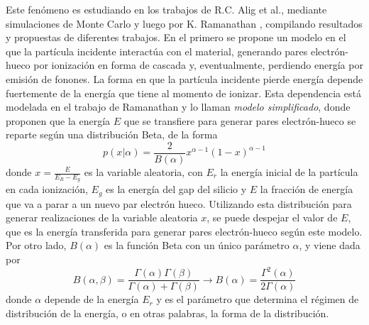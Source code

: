 Este fenómeno es estudiando en los trabajos de R.C. Alig et al.\cite{Alig}, mediante simulaciones de Monte Carlo y luego por K. Ramanathan \cite{Ramanathan}, compilando resultados y propuestas de diferentes trabajos. En el primero se propone un modelo en el que la partícula incidente interactúa con el material, generando pares electrón-hueco por ionización en forma de cascada y, eventualmente, perdiendo energía por emisión de fonones. La forma en que la partícula incidente pierde energía depende fuertemente de la energía que tiene al momento de ionizar. Esta dependencia está modelada en el trabajo de Ramanathan\cite{Ramanathan} y lo llaman \textit{modelo simplificado}, donde proponen que la energía $E$ que se transfiere para generar pares electrón-hueco se reparte según una distribución Beta, de la forma
\begin{equation*}
    p(x|\alpha) = \frac{2}{B(\alpha)} x^{\alpha - 1}(1-x)^{\alpha - 1}
\end{equation*}
donde $x = \frac{E}{E_{R} - E_{g}}$ es la variable aleatoria, con $E_{r}$ la energía inicial de la partícula en cada ionización, $E_{g}$ es la energía del gap del silicio y $E$ la fracción de energía que va a parar a un nuevo par electrón hueco. Utilizando esta distribución para generar realizaciones de la variable aleatoria $x$, se puede despejar el valor de $E$, que es la energía transferida para generar pares electrón-hueco según este modelo. Por otro lado, $B(\alpha)$ es la función Beta con un único parámetro $\alpha$, y viene dada por
\begin{equation*}
    B(\alpha, \beta) 
    = \frac{\Gamma(\alpha)\Gamma(\beta)}{\Gamma(\alpha) + \Gamma(\beta)}
    \longrightarrow
    B(\alpha)
    = \frac{\Gamma^{2}(\alpha)}{2\Gamma(\alpha)}
\end{equation*}
donde $\alpha$ depende de la energía $E_{r}$ y es el parámetro que determina el régimen de distribución de la energía, o en otras palabras, la forma de la distribución.

